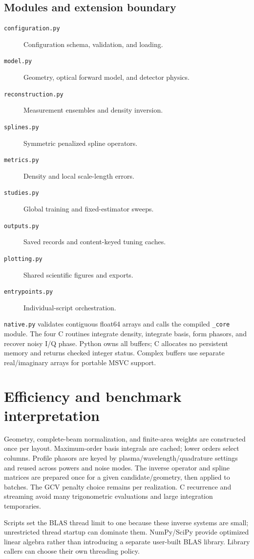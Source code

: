 \documentclass[11pt,letterpaper]{article}
\newcommand{\code}[1]{\nolinkurl{#1}}
\begin{document}
\subsection{Modules and extension boundary}
\begin{description}
\item[\code{configuration.py}] Configuration schema, validation, and loading.
\item[\code{model.py}] Geometry, optical forward model, and detector physics.
\item[\code{reconstruction.py}] Measurement ensembles and density inversion.
\item[\code{splines.py}] Symmetric penalized spline operators.
\item[\code{metrics.py}] Density and local scale-length errors.
\item[\code{studies.py}] Global training and fixed-estimator sweeps.
\item[\code{outputs.py}] Saved records and content-keyed tuning caches.
\item[\code{plotting.py}] Shared scientific figures and exports.
\item[\code{entrypoints.py}] Individual-script orchestration.
\end{description}
\code{native.py} validates contiguous float64 arrays and calls the compiled
\code{_core} module. The four C routines integrate density, integrate basis,
form phasors, and recover noisy I/Q phase. Python owns all buffers; C allocates
no persistent memory and returns checked integer status. Complex buffers use
separate real/imaginary arrays for portable MSVC support.

\section{Efficiency and benchmark interpretation}
Geometry, complete-beam normalization, and finite-area weights are constructed
once per layout. Maximum-order basis integrals are cached; lower orders select
columns. Profile phasors are keyed by plasma/wavelength/quadrature settings and
reused across powers and noise modes. The inverse operator and spline matrices
are prepared once for a given candidate/geometry, then applied to batches.
The GCV penalty choice remains per realization. C recurrence and streaming avoid
many trigonometric evaluations and large integration temporaries.

Scripts set the BLAS thread limit to one because these inverse systems are
small; unrestricted thread startup can dominate them. NumPy/SciPy provide
optimized linear algebra rather than introducing a separate user-built BLAS
library. Library callers can choose their own threading policy.
\end{document}
